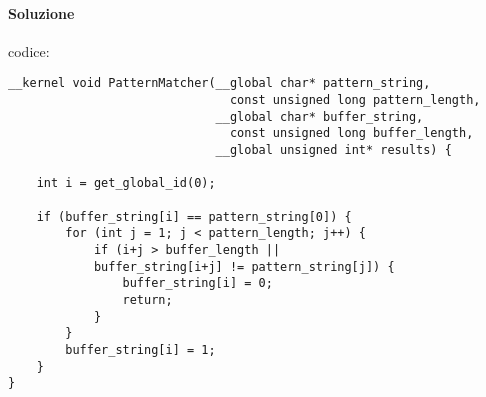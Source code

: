 \paragraph{Soluzione}
codice:
\begin{lstlisting}
__kernel void PatternMatcher(__global char* pattern_string,
                               const unsigned long pattern_length,
                             __global char* buffer_string,
                               const unsigned long buffer_length,
                             __global unsigned int* results) {

	int i = get_global_id(0);

	if (buffer_string[i] == pattern_string[0]) {
		for (int j = 1; j < pattern_length; j++) {
			if (i+j > buffer_length ||
			buffer_string[i+j] != pattern_string[j]) {
				buffer_string[i] = 0;
				return;
			}
		}
		buffer_string[i] = 1;
	}
}
\end{lstlisting}